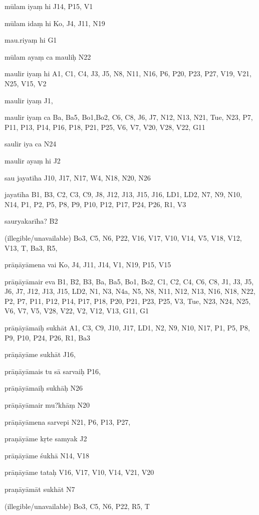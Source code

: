 \begin{ekdosis}
\begin{marma}[hp01_055]
\begin{marma}[hp02_009]
\begin{marma}[hp02_011]
 \begin{marma}[hp02_35d]
\item[mūlam iyaṃ hi] J14, P15, V1
\item[mūlam idaṃ hi] Ko, J4, J11, N19
\item[mau.riyaṃ hi] G1
\item[mūlam ayaṃ ca mauliḥ] N22
\item[maulir iyaṃ hi] A1, C1, C4, J3, J5, N8, N11, N16, P6, P20, P23, P27, V19, V21, N25, V15, V2
\item[maulir iyaṃ] J1,
\item[maulir iyaṃ ca] Ba, Ba5, Bo1,Bo2, C6, C8, J6, J7, N12, N13, N21, Tue, N23, P7, P11, P13, P14, P16, P18, P21, P25, V6, V7, V20, V28, V22, G11
\item[saulir iya ca] N24
\item[maulir ayaṃ hi] J2
\item[sau jayatīha] J10, J17, N17, W4, N18, N20, N26
\item[jayatīha] B1, B3, C2, C3, C9, J8, J12, J13, J15, J16, LD1, LD2, N7, N9, N10, N14, P1, P2, P5, P8, P9, P10, P12, P17, P24, P26, R1, V3
\item[sauryakarīha?] B2
\item[(illegible/unavailable)] Bo3, C5, N6, P22, V16, V17, V10, V14, V5, V18, V12, V13, T, Ba3, R5,
  \begin{description}

    \end{description}
 \end{marma}

 \begin{marma}[hp02_38a]
\item[prāṇāyāmena vai] Ko, J4, J11, J14, V1, N19, P15, V15
\item[prāṇāyāmair eva] B1, B2, B3, Ba, Ba5, Bo1, Bo2, C1, C2, C4, C6, C8, J1, J3, J5, J6, J7, J12, J13, J15, LD2, N1, N3, N4a, N5, N8, N11, N12, N13, N16, N18, N22, P2, P7, P11, P12, P14, P17, P18, P20, P21, P23, P25, V3, Tue, N23, N24, N25, V6, V7, V5, V28, V22, V2, V12, V13, G11, G1
\item[prāṇāyāmaiḥ sukhāt] A1, C3, C9, J10, J17, LD1, N2, N9, N10, N17, P1, P5, P8, P9, P10, P24, P26, R1, Ba3
\item[prāṇāyāme sukhāt] J16,
\item[prāṇāyāmais tu sā sarvaiḥ] P16,
\item[prāṇāyāmaiḥ sukhāḥ] N26
\item[prāṇāyāmair mu?khāṃ] N20
\item[prāṇāyāmena sarvepi] N21, P6, P13, P27, 
\item[praṇāyāme kṛte samyak] J2
\item[prāṇāyāme śukhā] N14, V18
\item[prāṇāyāme tataḥ] V16, V17, V10, V14, V21, V20
\item[praṇāyāmāt sukhāt] N7
\item[(illegible/unavailable)] Bo3, C5, N6, P22, R5, T
  \begin{description}


\end{description}
\end{marma}
\end{marma}
\end{marma}
\end{marma}
\end{ekdosis}
